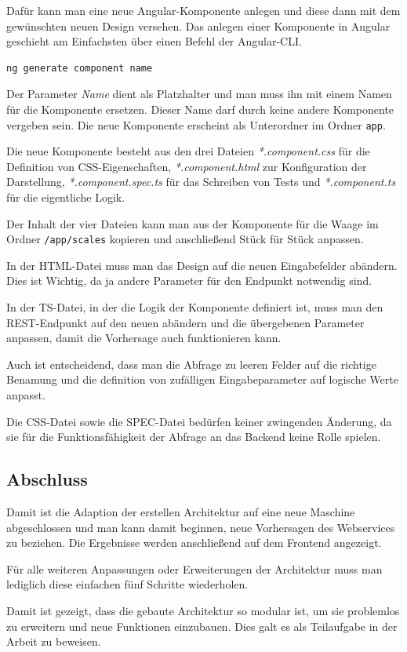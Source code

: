 Dafür kann man eine neue Angular-Komponente anlegen und diese dann mit dem gewünschten neuen Design versehen. Das
anlegen einer Komponente in Angular geschieht am Einfachsten über einen Befehl der Angular-CLI.

\begin{lstlisting}[caption=Erstellen einer neuen Komponente, label=ls:schlauchbeutelmaschine_component]
    ng generate component name
\end{lstlisting}

Der Parameter \textit{Name} dient als Platzhalter und man muss ihn mit einem Namen für die Komponente ersetzen. Dieser
Name darf durch keine andere Komponente vergeben sein. Die neue Komponente erscheint als Unterordner im Ordner
\texttt{app}.

Die neue Komponente besteht aus den drei Dateien \textit{*.component.css} für die Definition von CSS-Eigenschaften,
\textit{*.component.html} zur Konfiguration der Darstellung, \textit{*.component.spec.ts} für das Schreiben von Tests
und \textit{*.component.ts} für die eigentliche Logik.

Der Inhalt der vier Dateien kann man aus der Komponente für die Waage im Ordner \texttt{/app/scales} kopieren und
anschließend Stück für Stück anpassen.

In der HTML-Datei muss man das Design auf die neuen Eingabefelder abändern. Dies ist Wichtig, da ja andere Parameter für
den Endpunkt notwendig sind.

In der TS-Datei, in der die Logik der Komponente definiert ist, muss man den REST-Endpunkt auf den neuen abändern und
die übergebenen Parameter anpassen, damit die Vorhersage auch funktionieren kann.

Auch ist entscheidend, dass man die Abfrage zu leeren Felder auf die richtige Benamung und die definition von
zufälligen Eingabeparameter auf logische Werte anpasst.

Die CSS-Datei sowie die SPEC-Datei bedürfen keiner zwingenden Änderung, da sie für die Funktionsfähigkeit der Abfrage an
das Backend keine Rolle spielen.

\subsection{Abschluss}
Damit ist die Adaption der erstellen Architektur auf eine neue Maschine abgeschlossen und man kann damit beginnen,
neue Vorhersagen des Webservices zu beziehen. Die Ergebnisse werden anschließend auf dem Frontend angezeigt.

Für alle weiteren Anpassungen oder Erweiterungen der Architektur muss man lediglich diese einfachen fünf Schritte
wiederholen.

Damit ist gezeigt, dass die gebaute Architektur so modular ist, um sie problemlos zu erweitern und neue Funktionen
einzubauen. Dies galt es als Teilaufgabe in der Arbeit zu beweisen.
